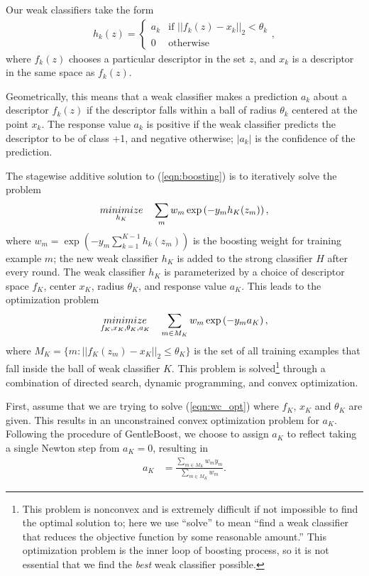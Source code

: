 \documentclass[conference]{IEEEtran}
\begin{document}
Our weak classifiers take the form
\begin{eqnarray*}
  h_k(z) = \begin{cases}
    a_k & \text{if $||f_k(z) - x_k||_2 < \theta_k$} \\
    0 & \text{otherwise}
  \end{cases},
\end{eqnarray*}
where $f_k(z)$ chooses a particular descriptor in the set $z$, and $x_k$ is a descriptor in the same space as $f_k(z)$.

Geometrically, this means that a weak classifier makes a prediction $a_k$ about a descriptor $f_k(z)$ if the descriptor falls within a ball of radius $\theta_k$ centered at the point $x_k$. The response value $a_k$ is positive if the weak classifier predicts the descriptor to be of class +1, and negative otherwise; $|a_k|$ is the confidence of the prediction.

The stagewise additive solution to (\ref{eqn:boosting}) is to iteratively solve the problem
\begin{align}
  \underset{h_K}{\relax{minimize}} \quad \sum_m w_m \exp \left(- y_m h_K(z_m) \right),
\end{align}
where $w_m = \exp \left(-y_m \sum_{k=1}^{K-1} h_k(z_m) \right)$ is the boosting weight for training example $m$; the new weak classifier $h_K$ is added to the strong classifier $H$ after every round.  The weak classifier $h_K$ is parameterized by a choice of descriptor space $f_K$, center $x_K$, radius $\theta_K$, and response value $a_K$.  This leads to the optimization problem
\begin{align}
  \minimize{f_K, x_K, \theta_K, a_K} \quad \sum_{m \in M_K} w_m \exp \left(-y_m a_K \right), \label{eqn:wc_opt}
\end{align}
where $M_K = \{m : ||f_K(z_m) - x_K||_2 \leq \theta_K\}$ is the set of all training examples that fall inside the ball of weak classifier $K$.  This problem is solved\footnote{This problem is nonconvex and is extremely difficult if not impossible to find the optimal solution to; here we use ``solve'' to mean ``find a weak classifier that reduces the objective function by some reasonable amount.''  This optimization problem is the inner loop of boosting process, so it is not essential that we find the \textit{best} weak classifier possible.} through a combination of directed search, dynamic programming, and convex optimization.

First, assume that we are trying to solve (\ref{eqn:wc_opt}) where $f_K$, $x_K$ and $\theta_K$ are given.  This results in an unconstrained convex optimization problem for $a_K$.  Following the procedure of GentleBoost, we choose to assign $a_K$ to reflect taking a single Newton step from $a_K = 0$, resulting in
\begin{align}
  a_K &= \frac{\sum_{m \in M_K} w_m y_m}{\sum_{m \in M_K} w_m}. \label{eqn:response_val}
\end{align}
\end{document}
